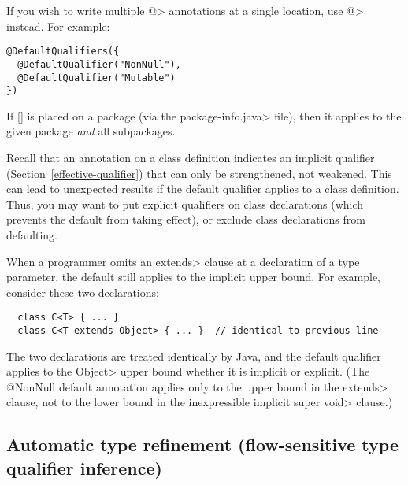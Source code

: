 If you wish to write multiple
\<@> annotations at a single location,
use
\<@> instead.  For example:

\begin{Verbatim}
@DefaultQualifiers({
  @DefaultQualifier("NonNull"),
  @DefaultQualifier("Mutable")
})
\end{Verbatim}


If [] is placed on a package (via the
\<package-info.java> file), then it applies to the given package \emph{and}
all subpackages.

Recall that an annotation on a class definition indicates an implicit
qualifier (Section~\ref{effective-qualifier}) that can only be
strengthened, not weakened.  This can lead to unexpected results if
the default qualifier applies to a class definition.  Thus, you may want to
put explicit qualifiers on class declarations (which prevents the default
from taking effect), or exclude class declarations from defaulting.




When a programmer omits an \<extends> clause at a declaration of a type
parameter, the default still applies to the implicit upper bound.  For
example, consider these two declarations:

\begin{Verbatim}
  class C<T> { ... }
  class C<T extends Object> { ... }  // identical to previous line
\end{Verbatim}

\noindent
The two declarations are treated identically by Java, and the default
qualifier applies to the \<Object> upper bound whether it is implicit or
explicit.  (The @NonNull default annotation applies only to the upper bound
in the \<extends> clause, not to the lower bound in the inexpressible
implicit \<super void> clause.)


\subsection{Automatic type refinement (flow-sensitive type qualifier inference)\label{type-refinement}}

